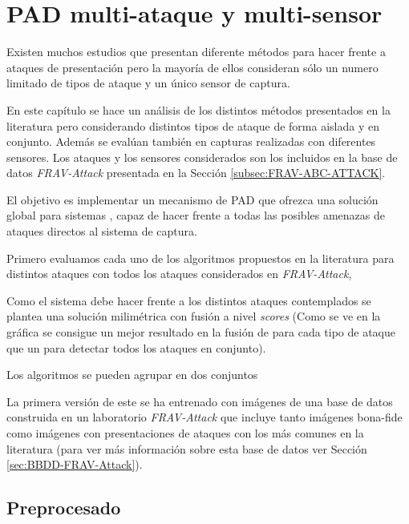 \chapter{PAD multi-ataque y multi-sensor}\label{ch:PAD_MULTIATAQUE}

Existen muchos estudios que presentan diferente métodos para hacer frente a ataques de presentación pero la mayoría de ellos consideran sólo un numero limitado de tipos de ataque y un único sensor de captura.

En este capítulo se hace un análisis de los distintos métodos presentados en la literatura pero considerando distintos tipos de ataque de forma aislada y en conjunto. Además se evalúan también en capturas realizadas con diferentes sensores. Los ataques y los sensores considerados son los incluidos en la base de datos \textit{\Gls{FRAV-Attack}} presentada en la Sección \ref{subsec:FRAV-ABC-ATTACK}.

El objetivo es implementar un mecanismo de PAD que ofrezca una solución global para sistemas , capaz de hacer frente a todas las posibles amenazas de ataques directos al sistema de captura.


Primero evaluamos cada uno de los algoritmos propuestos en la literatura para distintos ataques con todos los ataques considerados en \textit{\gls{FRAV-Attack}},


Como el sistema debe hacer frente a los distintos ataques contemplados se plantea una solución milimétrica con fusión a nivel \textit{scores} (Como se ve en la gráfica se consigue un mejor resultado en la fusión de  para cada tipo de ataque que un  para detectar todos los ataques en conjunto).

Los algoritmos se pueden agrupar en dos conjuntos 

\color{blue}La primera versión de este  se ha entrenado con imágenes de una base de datos construida en un laboratorio \textit{\Gls{FRAV-Attack}} que incluye tanto imágenes \gls{bona-fide} como imágenes con presentaciones de ataques con los  más comunes en la literatura (para ver más información sobre esta base de datos ver Sección \ref{sec:BBDD-FRAV-Attack}).\color{black}

\section{Preprocesado}\label{sec:PAD_PRERPROCESADO}

